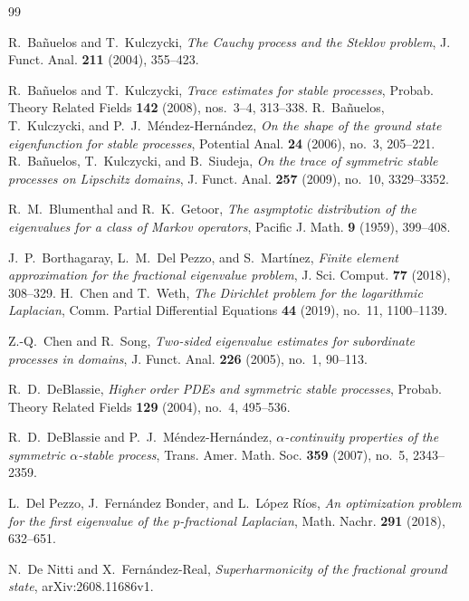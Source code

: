 \documentclass[11pt]{amsart}
\numberwithin{equation}{section}
\theoremstyle{remark}
\begin{document}
\begin{thebibliography}{99}
\small

R.~Ba\~nuelos and T.~Kulczycki,
\emph{The Cauchy process and the Steklov problem},
J. Funct. Anal. \textbf{211} (2004), 355--423.

R.~Ba\~nuelos and T.~Kulczycki,
\emph{Trace estimates for stable processes},
Probab. Theory Related Fields \textbf{142} (2008), nos.~3--4, 313--338.
R.~Ba\~nuelos, T.~Kulczycki, and P.~J.~M\'endez-Hern\'andez,
\emph{On the shape of the ground state eigenfunction for stable processes},
Potential Anal. \textbf{24} (2006), no.~3, 205--221.
R.~Ba\~nuelos, T.~Kulczycki, and B.~Siudeja,
\emph{On the trace of symmetric stable processes on Lipschitz domains},
J. Funct. Anal. \textbf{257} (2009), no.~10, 3329--3352.

R.~M.~Blumenthal and R.~K.~Getoor,
\emph{The asymptotic distribution of the eigenvalues for a class of Markov
operators},
Pacific J. Math. \textbf{9} (1959), 399--408.

J.~P.~Borthagaray, L.~M.~Del Pezzo, and S.~Mart\'inez,
\emph{Finite element approximation for the fractional eigenvalue problem},
J. Sci. Comput. \textbf{77} (2018), 308--329.
H.~Chen and T.~Weth,
\emph{The Dirichlet problem for the logarithmic Laplacian},
Comm. Partial Differential Equations \textbf{44} (2019), no.~11, 1100--1139.

Z.-Q.~Chen and R.~Song,
\emph{Two-sided eigenvalue estimates for subordinate processes in domains},
J. Funct. Anal. \textbf{226} (2005), no.~1, 90--113.

R.~D.~DeBlassie,
\emph{Higher order PDEs and symmetric stable processes},
Probab. Theory Related Fields \textbf{129} (2004), no.~4, 495--536.

R.~D.~DeBlassie and P.~J.~M\'endez-Hern\'andez,
\emph{$\alpha$-continuity properties of the symmetric $\alpha$-stable
process},
Trans. Amer. Math. Soc. \textbf{359} (2007), no.~5, 2343--2359.

L.~Del Pezzo, J.~Fern\'andez Bonder, and L.~L\'opez R\'ios,
\emph{An optimization problem for the first eigenvalue of the
$p$-fractional Laplacian},
Math. Nachr. \textbf{291} (2018), 632--651.

N.~De Nitti and X.~Fern\'andez-Real,
\emph{Superharmonicity of the fractional ground state},
arXiv:2608.11686v1.


\end{thebibliography}
\end{document}
